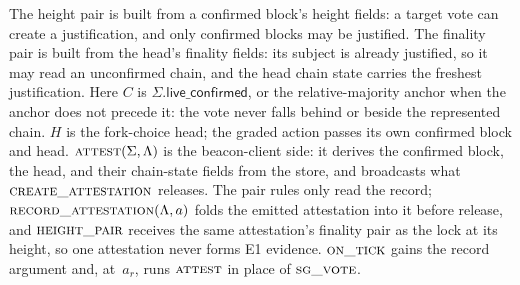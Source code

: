 \documentclass{article}
\theoremstyle{plain}
\theoremstyle{definition}
\theoremstyle{remark}
\newcommand{\liveConfirmed}{\mathsf{live\_confirmed}}
\begin{document}
The height pair is built from a confirmed block's height fields: a target
vote can create a justification, and
only confirmed blocks may be justified.  The finality pair is built from
the head's finality fields: its subject is
already justified, so it may read an unconfirmed chain, and the head
chain state carries the freshest justification.  Here $C$ is
$\Sigma.\liveConfirmed$, or the relative-majority anchor when the anchor
does not precede it: the vote never falls behind or beside the
represented chain.  $H$ is the fork-choice head; the
graded action passes its own confirmed block and head.
$\Call{attest}{\Sigma,\Lambda}$ is the beacon-client side: it derives
the confirmed block, the head, and their chain-state fields from the
store, and
broadcasts what $\Call{create\_attestation}{}$ releases.  The pair rules
only read the record; $\Call{record\_attestation}{\Lambda,a}$ folds the
emitted attestation into it before release, and
$\Call{height\_pair}{}$ receives the same attestation's finality pair as
the lock at its height, so one attestation never forms E1 evidence.
$\Call{on\_tick}{}$ gains the record argument and, at~$a_r$, runs
$\Call{attest}{}$ in place of $\Call{sg\_vote}{}$.
\end{document}
